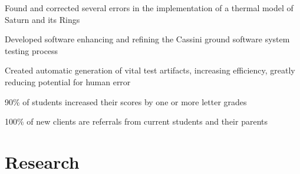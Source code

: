 \documentclass[letterpaper]{deedy-resume} %
\begin{document}
\begin{minipage}[t]{0.66\textwidth}
\begin{tightitemize}
\item Found and corrected several errors in the implementation of a thermal model of Saturn and its Rings
\item Developed software enhancing and refining the Cassini ground software system testing process
\item Created automatic generation of vital test artifacts, increasing efficiency, greatly reducing potential for human error
\end{tightitemize}

\sectionspace %



\begin{tightitemize}
\item 90\% of students increased their scores by one or more letter grades
\item 100\% of new clients are referrals from current students and their parents
\end{tightitemize}

\sectionspace %

\section{Research}



\end{minipage}
\end{document}
